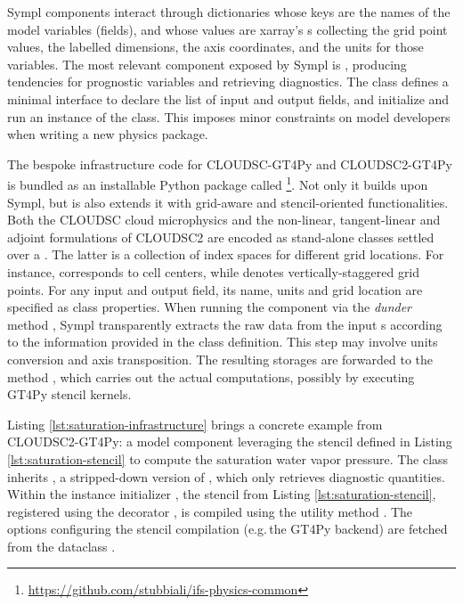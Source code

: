 \documentclass[main.tex]{subfiles}
\begin{document}
        Sympl components interact through dictionaries whose keys are the names of the model variables (fields), and whose values are xarray's s \citep{hoyer17} collecting the grid point values, the labelled dimensions, the axis coordinates, and the units for those variables. The most relevant component exposed by Sympl is , producing tendencies for prognostic variables and retrieving diagnostics. The class defines a minimal interface to declare the list of input and output fields, and initialize and run an instance of the class. This imposes minor constraints on model developers when writing a new physics package.

        The bespoke infrastructure code for CLOUDSC-GT4Py and CLOUDSC2-GT4Py is bundled as an installable Python package called \footnote{\url{https://github.com/stubbiali/ifs-physics-common}}. Not only it builds upon Sympl, but is also extends it with grid-aware and stencil-oriented functionalities. Both the CLOUDSC cloud microphysics and the non-linear, tangent-linear and adjoint formulations of CLOUDSC2 are encoded as stand-alone  classes settled over a . The latter is a collection of index spaces for different grid locations. For instance,  corresponds to cell centers, while  denotes vertically-staggered grid points. For any input and output field, its name, units and grid location are specified as class properties. When running the component via the \emph{dunder} method , Sympl transparently extracts the raw data from the input s according to the information provided in the class definition. This step may involve units conversion and axis transposition. The resulting storages are forwarded to the method , which carries out the actual computations, possibly by executing GT4Py stencil kernels.

        Listing \ref{lst:saturation-infrastructure} brings a concrete example from CLOUDSC2-GT4Py: a model component leveraging the stencil defined in Listing \ref{lst:saturation-stencil} to compute the saturation water vapor pressure. The class inherits , a stripped-down version of , which only retrieves diagnostic quantities. Within the instance initializer , the stencil from Listing \ref{lst:saturation-stencil}, registered using the decorator , is compiled using the utility method . The options configuring the stencil compilation (e.g.\,the GT4Py backend) are fetched from the dataclass .

    \biblio
\end{document}
